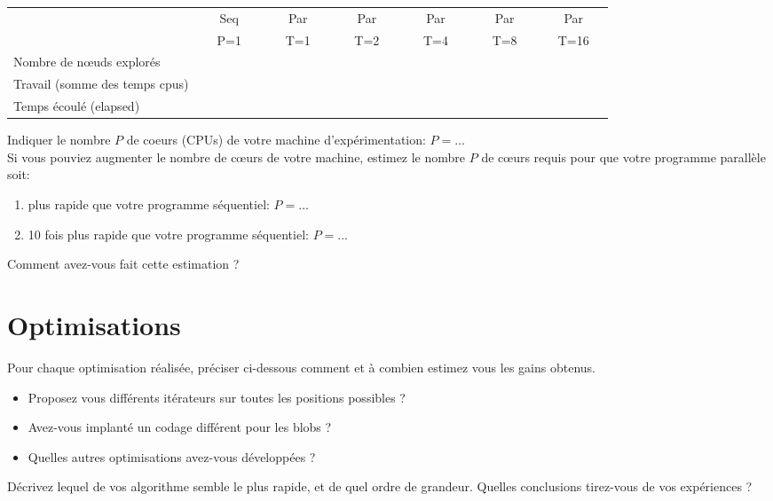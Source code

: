 \documentclass[a4paper, 11pt]{article}
\begin{document}
\begin{center}
\begin{tabular}{|l||c|c|c|c|c|c||}
\hline
                          & ~~~Seq~~~ & ~~~Par~~~ & ~~~Par~~~ & ~~~Par~~~ & ~~~Par~~~ & ~~~Par~~~   \\
                          & P=1 & T=1  & T=2 & T=4 & T=8 & T=16  \\
\hline
Nombre de n{\oe}uds explorés      & & & & & &  \\
\hline
Travail (somme des temps cpus) & & & & & &  \\
\hline
Temps écoulé (elapsed)         & & & & & & \\
\hline
\end{tabular} 
\end{center}
Indiquer le nombre $P$  de coeurs (CPUs) de votre machine d'expérimentation: $P = \ldots$ \\
Si vous pouviez augmenter le nombre de c{\oe}urs de votre machine, estimez le nombre $P$ de  c{\oe}urs requis pour que votre programme parallèle soit:
\begin{enumerate}
\item plus rapide que votre programme séquentiel: $P=\ldots $
\item 10 fois plus rapide que votre programme séquentiel: $P=\ldots $
\end{enumerate}
Comment avez-vous fait cette estimation ? %

\vspace*{3cm}

\newpage
\section{Optimisations}
Pour chaque optimisation réalisée, préciser ci-dessous comment et à combien estimez vous les
gains obtenus.
\begin{itemize}
\item Proposez vous différents itérateurs sur toutes les positions possibles ?
\vspace{1cm}
\item Avez-vous implanté un codage différent pour les blobs ?
\vspace{1cm}
\item Quelles autres optimisations avez-vous développées ?
\end{itemize}
\vspace{2cm}
Décrivez lequel de vos algorithme semble le plus rapide, et de quel ordre de grandeur.
Quelles conclusions tirez-vous de vos expériences ?
\vspace{2cm}
\end{document}
